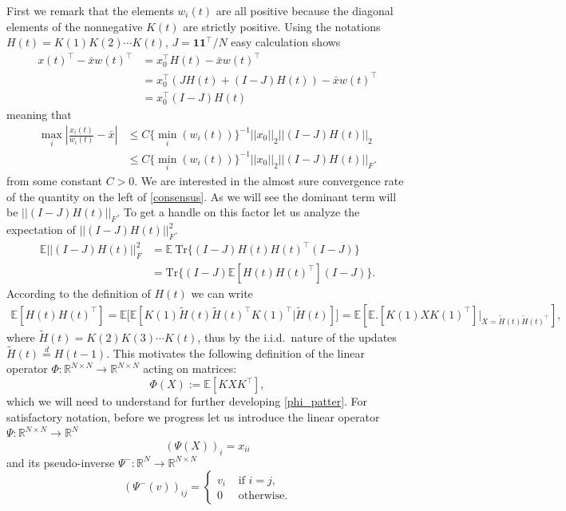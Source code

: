\documentclass[a4paper,12pt]{article}
\begin{document}
First we remark that the elements $w_i(t)$ are all positive because the diagonal elements of the nonnegative $K(t)$ are strictly positive.
Using the notations $H(t)=K(1)K(2)\cdots K(t)$, $J=\mathbf 1 \mathbf 1^\top /N$
easy calculation shows
\begin{align*}  x(t)^\top - \bar x w(t)^\top  &= x_0^\top H(t)- \bar x w(t)^\top \\ 
	&= x_0^\top(JH(t) + (I-J)H(t)) - \bar x w(t)^\top \\ 
	&=x_0^\top(I-J)H(t)
\end{align*}
meaning that 
\begin{align}
	\nonumber	\max_i \left|\frac{x_i(t)}{w_i(t)}-\bar x\right| &\leq C \{\min_i(w_i(t))\}^{-1} ||x_0||_2 ||(I-J)H(t)||_2\\ &\leq C \{\min_i(w_i(t))\}^{-1} ||x_0||_2 ||(I-J)H(t)||_F. \label{consensus}
\end{align}
from some constant $C>0$. We are interested in the almost sure convergence rate of the quantity on the left of \eqref{consensus}. As we will see the dominant term will be $||(I-J)H(t)||_F$. To get a handle on this factor let us analyze
the expectation of $ || (I-J)H(t)||_F^2 $. 
\begin{align*}
	\mathbb E||(I-J)H(t)||_F^2 &= \mathbb E\ \mathrm{Tr}\{(I-J)H(t)H(t)^\top (I-J)\} \\ & = \mathrm{Tr}\{ (I-J) \mathbb E[H(t)H(t)^\top] (I-J) \}.
\end{align*}
According to the definition of $H(t)$ we can write
\begin{align}
	\label{phi_patter}
	\mathbb E[H(t)H(t)^\top] = \mathbb E \big[\mathbb E[K(1) \tilde H(t) \tilde H(t)^\top K(1)^\top\big| \tilde H(t) ] \big] = \mathbb E[\mathbb E\big.  [K(1)XK(1)^\top]\big|_{X=\tilde H(t)\tilde H(t)^\top}],
\end{align}
where $\tilde H(t) = K(2)K(3)\cdots K(t)$, thus by the i.i.d.\ nature of the updates $\tilde H(t) \stackrel{d}{=} H(t-1)$.
This motivates the following definition of the linear operator $\Phi: \mathbb R^{N\times N} \to \mathbb R^{N\times N}$ acting on matrices:
$$
\Phi(X):=\mathbb E[KXK^\top],
$$
which we will need to understand for further developing \eqref{phi_patter}.
For satisfactory notation, before we progress let us introduce the linear operator $\Psi: \mathbb R^{N\times N} \to \mathbb R^{N}$ 
$$ (\Psi(X))_{i} =  x_{ii} $$
and its pseudo-inverse $\Psi^-:\mathbb R^{N}\to \mathbb R^{N\times N}$ 
$$ (\Psi^-(v))_{ij} = \begin{cases}
	v_{i} & \mbox{ if } i=j, \\
	0 & \mbox{ otherwise.}
\end{cases}  $$ 
\end{document}
